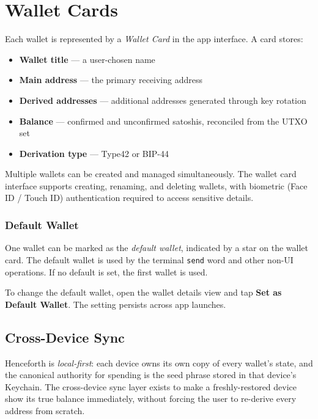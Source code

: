 \documentclass[a4paper, 11pt, openany]{book}
\begin{document}
\section{Wallet Cards}

Each wallet is represented by a \emph{Wallet Card} in the app interface. A card stores:

\begin{itemize}
\item \textbf{Wallet title} --- a user-chosen name
\item \textbf{Main address} --- the primary receiving address
\item \textbf{Derived addresses} --- additional addresses generated through key rotation
\item \textbf{Balance} --- confirmed and unconfirmed satoshis, reconciled from the UTXO set
\item \textbf{Derivation type} --- Type42 or BIP-44
\end{itemize}

Multiple wallets can be created and managed simultaneously. The wallet card interface supports creating, renaming, and deleting wallets, with biometric (Face ID / Touch ID) authentication required to access sensitive details.

\subsubsection*{Default Wallet}

One wallet can be marked as the \emph{default wallet}, indicated by a star on the wallet card. The default wallet is used by the terminal \texttt{send} word and other non-UI operations. If no default is set, the first wallet is used.

To change the default wallet, open the wallet details view and tap \textbf{Set as Default Wallet}. The setting persists across app launches.

\subsection{Cross-Device Sync}

Henceforth is \emph{local-first}: each device owns its own copy of every wallet's state, and the canonical authority for spending is the seed phrase stored in that device's Keychain. The cross-device sync layer exists to make a freshly-restored device show its true balance immediately, without forcing the user to re-derive every address from scratch.
\end{document}

